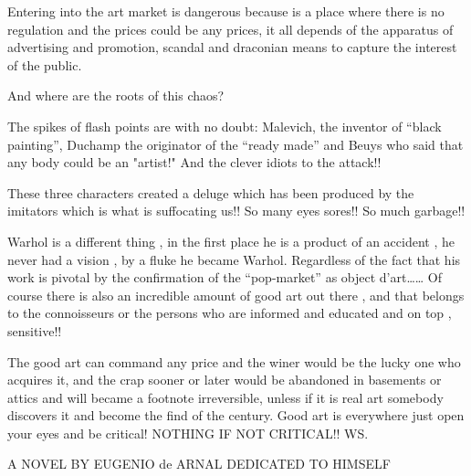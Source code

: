 \documentclass[smalldemyvopaper,11pt,twoside,onecolumn,openright,extrafontsizes]{memoir}
\begin{document}
Entering into the art market is dangerous because is a place where there is no regulation and the prices could be any prices, it all depends of the apparatus of advertising and promotion, scandal and draconian means to capture the interest of the public.

And where are the roots of this chaos? 

The spikes of flash points are with no doubt: Malevich, the inventor of “black painting”, Duchamp the originator of the “ready made”  and Beuys who said that any body could be an "artist!" And the clever idiots to the attack!! 

These three characters created a deluge which has been produced by the imitators which is what is suffocating us!! So many eyes sores!! So much garbage!!

Warhol is a different thing , in the first place he is a product of an accident , he never had a vision , by a fluke he became Warhol. Regardless of the fact that his work is pivotal by the confirmation of the  “pop-market” as object d’art…… Of course there is also an incredible amount of good art out there , and that belongs to the connoisseurs or the persons who are informed and educated and on top ,  sensitive!!

The good art can command any price and the winer would be the lucky one who acquires it, and the crap sooner or later would be abandoned in basements or attics  and will became a footnote irreversible, unless if it is real art somebody discovers it and become the find of the century. Good art is everywhere just open your eyes and be critical! NOTHING IF NOT CRITICAL!! WS.

\vfill

\begin{center}
    A NOVEL BY EUGENIO de ARNAL DEDICATED TO HIMSELF
\end{center}
\end{document}
